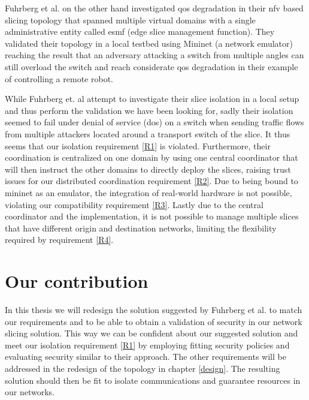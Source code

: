 Fuhrberg et al. \cite{SE4} on the other hand investigated \acrshort{qos} degradation in their \acrshort{nfv} based slicing topology that spanned multiple virtual domains with a single administrative entity called \acrshort{esmf} (edge slice management function). They validated their topology in a local testbed using Mininet \cite{mininet} (a network emulator) reaching the result that an adversary attacking a switch from multiple angles can still overload the switch and reach considerate \acrshort{qos} degradation in their example of controlling a remote robot.

While Fuhrberg et. al \cite{SE4} attempt to investigate their slice isolation in a local setup and thus perform the validation we have been looking for, sadly their isolation seemed to fail under denial of service (\acrshort{dos}) on a switch when sending traffic flows from multiple attackers located around a transport switch of the slice. It thus seems that our isolation requirement \ref{R1} is violated. Furthermore, their coordination is centralized on one domain by using one central coordinator that will then instruct the other domains to directly deploy the slices, raising trust issues for our distributed coordination requirement \ref{R2}. Due to being bound to mininet \cite{mininet} as an emulator, the integration of real-world hardware is not possible, violating our compatibility requirement \ref{R3}. Lastly due to the central coordinator and the implementation, it is not possible to manage multiple slices that have different origin and destination networks, limiting the flexibility required by requirement \ref{R4}.

\section{Our contribution}
In this thesis we will redesign the solution suggested by Fuhrberg et al. \cite{SE4} to match our requirements and to be able to obtain a validation of security in our network slicing solution. This way we can be confident about our suggested solution and meet our isolation requirement \ref{R1} by employing fitting security policies and evaluating security similar to their approach. The other requirements will be addressed in the redesign of the topology in chapter \ref{design}. The resulting solution should then be fit to isolate communications and guarantee resources in our networks.


